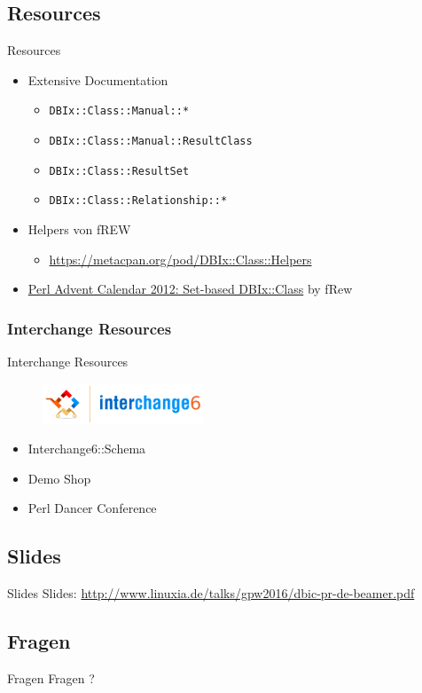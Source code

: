 \subsection{Resources}
\begin{frame}[fragile]{Resources}
\begin{itemize}
\item Extensive Documentation
\begin{itemize}
\item \verb|DBIx::Class::Manual::*|
\item \verb|DBIx::Class::Manual::ResultClass|
\item \verb|DBIx::Class::ResultSet|
\item \verb|DBIx::Class::Relationship::*|
\end{itemize}
\item Helpers von fREW
\begin{itemize}
\item \href{https://metacpan.org/pod/DBIx::Class::Helpers}{https://metacpan.org/pod/DBIx::Class::Helpers}
\end{itemize}
\item \href{http://www.perladvent.org/2012/2012-12-21.html}
{Perl Advent Calendar 2012: Set-based DBIx::Class}
by fRew
\end{itemize}
\end{frame}

\subsubsection{Interchange Resources}

\begin{frame}{Interchange Resources}
\begin{figure}[!ht]
\centering
\includegraphics[width=0.4\linewidth]{img/interchange6-logo-v2.png}
\end{figure}
\begin{itemize}
\item Interchange6::Schema
\item Demo Shop
\item Perl Dancer Conference
\end{itemize}
\end{frame}

\subsection{Slides}

\begin{frame}{Slides}
Slides:
\url{http://www.linuxia.de/talks/gpw2016/dbic-pr-de-beamer.pdf}
\end{frame}

\subsection{Fragen}

\begin{frame}{Fragen}
\centering
Fragen ?
\end{frame}




